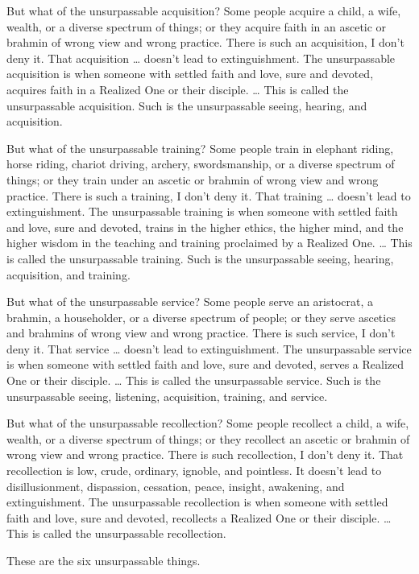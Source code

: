 \documentclass[12pt,openany]{book}%
\begin{document}
But what of the unsurpassable acquisition? Some people acquire a child, a wife, wealth, or a diverse spectrum of things; or they acquire faith in an ascetic or brahmin of wrong view and wrong practice. There is such an acquisition, I don’t deny it. That acquisition … doesn’t lead to extinguishment. The unsurpassable acquisition is when someone with settled faith and love, sure and devoted, acquires faith in a Realized One or their disciple. … This is called the unsurpassable acquisition. Such is the unsurpassable seeing, hearing, and acquisition. 

But what of the unsurpassable training? Some people train in elephant riding, horse riding, chariot driving, archery, swordsmanship, or a diverse spectrum of things; or they train under an ascetic or brahmin of wrong view and wrong practice. There is such a training, I don’t deny it. That training … doesn’t lead to extinguishment. The unsurpassable training is when someone with settled faith and love, sure and devoted, trains in the higher ethics, the higher mind, and the higher wisdom in the teaching and training proclaimed by a Realized One. … This is called the unsurpassable training. Such is the unsurpassable seeing, hearing, acquisition, and training. 

But what of the unsurpassable service? Some people serve an aristocrat, a brahmin, a householder, or a diverse spectrum of people; or they serve ascetics and brahmins of wrong view and wrong practice. There is such service, I don’t deny it. That service … doesn’t lead to extinguishment. The unsurpassable service is when someone with settled faith and love, sure and devoted, serves a Realized One or their disciple. … This is called the unsurpassable service. Such is the unsurpassable seeing, listening, acquisition, training, and service. 

But what of the unsurpassable recollection? Some people recollect a child, a wife, wealth, or a diverse spectrum of things; or they recollect an ascetic or brahmin of wrong view and wrong practice. There is such recollection, I don’t deny it. That recollection is low, crude, ordinary, ignoble, and pointless. It doesn’t lead to disillusionment, dispassion, cessation, peace, insight, awakening, and extinguishment. The unsurpassable recollection is when someone with settled faith and love, sure and devoted, recollects a Realized One or their disciple. … This is called the unsurpassable recollection. 

These are the six unsurpassable things. 
\end{document}
